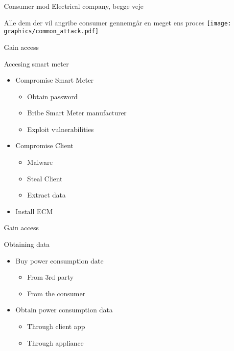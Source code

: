 \begin{frame}
  Consumer mod Electrical company, begge veje
\end{frame}

\begin{frame}
  Alle dem der vil angribe consumer gennemgår en meget ens proces
\center
  \texttt{[image: graphics/common\_attack.pdf]}
\end{frame}

\begin{frame}{Gain access}
  \begin{block}{Accesing smart meter}
    \begin{itemize}
      \item Compromise Smart Meter
      \begin{itemize}
        \item Obtain password
        \item Bribe Smart Meter manufacturer
        \item Exploit vulnerabilities
      \end{itemize}
      \item Compromise Client
      \begin{itemize}
        \item Malware
        \item Steal Client
        \item Extract data
      \end{itemize}
      \item Install ECM
    \end{itemize}
  \end{block}
\end{frame}

\begin{frame}{Gain access}
  \begin{block}{Obtaining data }
    \begin{itemize}
      \item Buy power consumption date
      \begin{itemize}
        \item From 3rd party
        \item From the consumer
      \end{itemize}
      \item Obtain power consumption data
      \begin{itemize}
        \item Through client app
        \item Through appliance
      \end{itemize}
    \end{itemize}
  \end{block}
\end{frame}

